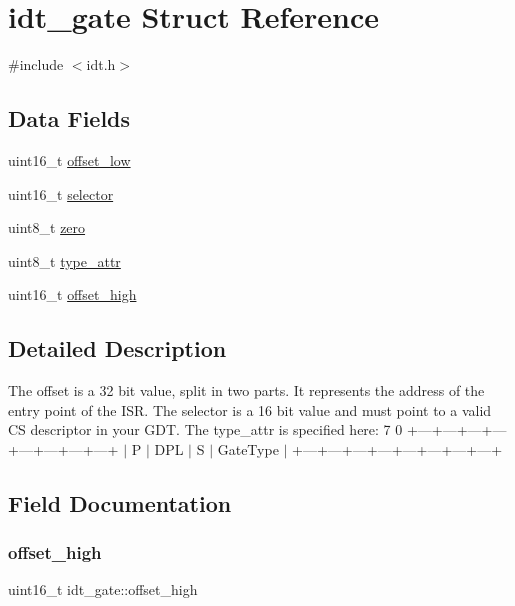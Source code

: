 \hypertarget{structidt__gate}{}\section{idt\+\_\+gate Struct Reference}
\label{structidt__gate}


{\ttfamily \#include $<$idt.\+h$>$}

\subsection*{Data Fields}
\begin{DoxyCompactItemize}
\item 
uint16\+\_\+t \hyperlink{structidt__gate_a2f2fbb6c1ec5f96c04b4e16f2f1fc5d1}{offset\+\_\+low}
\item 
uint16\+\_\+t \hyperlink{structidt__gate_a839f4d5be34a2cf1c58190f8e7fe2b82}{selector}
\item 
uint8\+\_\+t \hyperlink{structidt__gate_af35a1b7ef8d77d21e5fe3346c87bda51}{zero}
\item 
uint8\+\_\+t \hyperlink{structidt__gate_a7e5a1fc61958deac39a65f975c2383aa}{type\+\_\+attr}
\item 
uint16\+\_\+t \hyperlink{structidt__gate_aa212ae9f5054c881745be383526c2dc0}{offset\+\_\+high}
\end{DoxyCompactItemize}


\subsection{Detailed Description}
The offset is a 32 bit value, split in two parts. It represents the address of the entry point of the I\+SR. The selector is a 16 bit value and must point to a valid CS descriptor in your G\+DT. The type\+\_\+attr is specified here\+: 7 0 +---+---+---+---+---+---+---+---+ $\vert$ P $\vert$ D\+PL $\vert$ S $\vert$ Gate\+Type $\vert$ +---+---+---+---+---+---+---+---+ 

\subsection{Field Documentation}
\mbox{\label{structidt__gate_aa212ae9f5054c881745be383526c2dc0}} 
\subsubsection{\texorpdfstring{offset\+\_\+high}{offset\_high}}
{\footnotesize\ttfamily uint16\+\_\+t idt\+\_\+gate\+::offset\+\_\+high}

